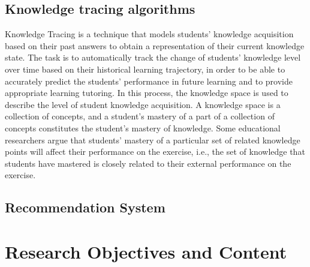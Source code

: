 \subsection{Knowledge tracing algorithms}
Knowledge Tracing is a technique that models students' knowledge acquisition based on their past answers to obtain a representation of their current knowledge state. The task is to automatically track the change of students' knowledge level over time based on their historical learning trajectory, in order to be able to accurately predict the students' performance in future learning and to provide appropriate learning tutoring. In this process, the knowledge space is used to describe the level of student knowledge acquisition. A knowledge space is a collection of concepts, and a student's mastery of a part of a collection of concepts constitutes the student's mastery of knowledge. Some educational researchers argue that students' mastery of a particular set of related knowledge points will affect their performance on the exercise, i.e., the set of knowledge that students have mastered is closely related to their external performance on the exercise.


\subsection{Recommendation System}


\section{Research Objectives and Content}  %

